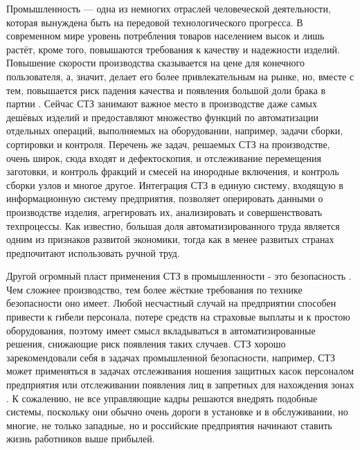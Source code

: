 Промышленность --- одна из немногих отраслей человеческой деятельности, которая вынуждена быть на передовой технологического прогресса. В современном мире уровень потребления товаров населением высок и лишь растёт, кроме того, повышаются требования к качеству и надежности изделий. Повышение скорости производства сказывается на цене для конечного пользователя, а, значит, делает его более привлекательным на рынке, но, вместе с тем, повышается риск падения качества и появления большой доли брака в партии \cite{Anand2019, Beyerer2016}. Сейчас СТЗ занимают важное место в производстве даже самых дешёвых изделий и предоставляют множество функций по автоматизации отдельных операций, выполняемых на оборудовании, например, задачи сборки, сортировки и контроля. Перечень же задач, решаемых СТЗ на производстве, очень широк, сюда входят и дефектоскопия, и отслеживание перемещения заготовки, и контроль фракций и смесей на инородные включения, и контроль сборки узлов и многое другое. Интеграция СТЗ в единую систему, входящую в информационную систему предприятия, позволяет оперировать данными о производстве изделия, агрегировать их, анализировать и совершенствовать техпроцессы. Как известно, большая доля автоматизированного труда является одним из признаков развитой экономики, тогда как в менее развитых странах предпочитают использовать ручной труд.

Другой огромный пласт применения СТЗ в промышленности - это безопасность \cite{FANG2020100980}. Чем сложнее производство, тем более жёсткие требования по технике безопасности оно имеет. Любой несчастный случай на предприятии способен привести к гибели персонала, потере средств на страховые выплаты и к простою оборудования, поэтому имеет смысл вкладываться в автоматизированные решения, снижающие риск появления таких случаев. СТЗ хорошо зарекомендовали себя в задачах промышленной безопасности, например, СТЗ может применяться в задачах отслеживания ношения защитных касок персоналом предприятия или отслеживании появления лиц в запретных для нахождения зонах \cite{Li2020}. К сожалению, не все управляющие кадры решаются внедрять подобные системы, поскольку они обычно очень дороги в установке и в обслуживании, но многие, не только западные, но и российские предприятия начинают ставить жизнь работников выше прибылей.


